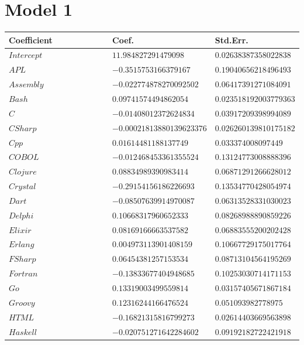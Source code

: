 \documentclass{report}
\begin{document}
\section{Model 1}
\label{data:model1}
\begin{longtable}{|R{0.4\linewidth}|R{0.3\linewidth}|R{0.3\linewidth}|}
  \hline
  \textbf{Coefficient} & \textbf{Coef.} & \textbf{Std.Err.} \\
  \hline
  $Intercept$ & $11.984827291479098$ & $0.02638387358022838$\\
  \hline
  $APL$ & $-0.3515753166379167$ & $0.19040656218496493$\\
  \hline
  $Assembly$ & $-0.022774878270092502$ & $0.06417391271084091$\\
  \hline
  $Bash$ & $0.09741574494862054$ & $0.023518192003779363$\\
  \hline
  $C$ & $-0.01408012372624834$ & $0.03917209398994089$\\
  \hline
  $CSharp$ & $-0.00021813880139623376$ & $0.026260139810175182$\\
  \hline
  $Cpp$ & $0.01614481188137749$ & $0.033374008097449$\\
  \hline
  $COBOL$ & $-0.012468453361355524$ & $0.13124773008888396$\\
  \hline
  $Clojure$ & $0.08834989390983414$ & $0.06871291266628012$\\
  \hline
  $Crystal$ & $-0.29154156186226693$ & $0.13534770428054974$\\
  \hline
  $Dart$ & $-0.08507639914970087$ & $0.06313528331030023$\\
  \hline
  $Delphi$ & $0.10668317960652333$ & $0.08268988890859226$\\
  \hline
  $Elixir$ & $0.08169166663537582$ & $0.06883555200202428$\\
  \hline
  $Erlang$ & $0.004973113901408159$ & $0.10667729175017764$\\
  \hline
  $FSharp$ & $0.06454381257153534$ & $0.08713104564195269$\\
  \hline
  $Fortran$ & $-0.13833677404948685$ & $0.10253030714171153$\\
  \hline
  $Go$ & $0.13319003499559814$ & $0.03157405671867184$\\
  \hline
  $Groovy$ & $0.12316244166476524$ & $0.051093982778975$\\
  \hline
  $HTML$ & $-0.16821315816799273$ & $0.02614403669563898$\\
  \hline
  $Haskell$ & $-0.020751271642284602$ & $0.09192182722421918$\\

\end{longtable}
\end{document}
